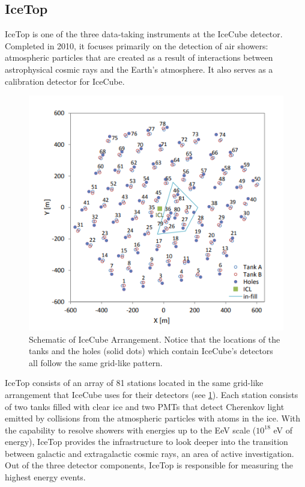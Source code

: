 \documentclass[11pt]{article}
\begin{document}
    \subsection{IceTop}
    IceTop is one of the three data-taking instruments at the IceCube detector. Completed 
    in 2010, it focuses primarily on the detection of air showers: atmospheric particles that are
    created as a result of interactions between astrophysical cosmic rays and the Earth's
    atmosphere. It also serves as a calibration detector for IceCube. 
 \begin{figure}
        \centering
        \includegraphics[scale=0.46]{icecube-arr.png}
        \caption{Schematic of IceCube Arrangement. Notice that the locations of the tanks and 
        the holes (solid dots) which contain IceCube's detectors all follow the same 
        grid-like pattern.}
        \label{icecube-arr}
    \end{figure}
    IceTop consists of an array of 81 stations located in the same grid-like arrangement
    that IceCube uses for their detectors (see \cref{icecube-arr}). Each station consists 
    of two tanks filled with clear ice and two PMTs that detect Cherenkov light emitted by
    collisions from the atmospheric particles with atoms in the ice. With the capability 
    to resolve showers with energies up to the EeV scale ($10^{18}$ eV of energy), IceTop 
    provides the infrastructure to look deeper into the transition between galactic and 
    extragalactic cosmic rays, an area of active investigation. Out of the three detector
    components, IceTop is responsible for measuring the highest energy events.
\end{document}
